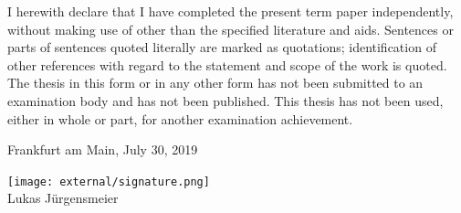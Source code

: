 \documentclass[12pt,a4paper]{article}
\begin{document}
I herewith declare that I have completed the present term paper independently, without making use of
other than the specified literature and aids. Sentences or parts of sentences quoted literally are
marked as quotations; identification of other references with regard to the statement and scope of
the work is quoted. The thesis in this form or in any other form has not been submitted to an examination body and has not been published.
This thesis has not been used, either in whole or part, for another examination achievement.

\vspace{1cm}

Frankfurt am Main, July 30, 2019

\texttt{[image: external/signature.png]}\\
Lukas J\"urgensmeier
\end{document}
